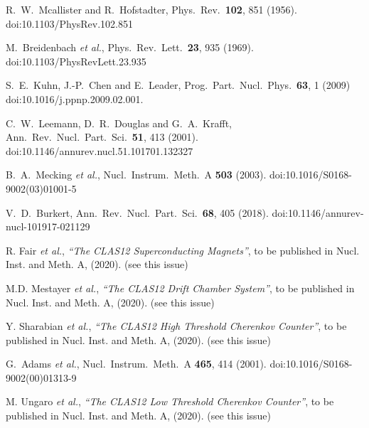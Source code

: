 \documentclass[final,3p,twocolumn]{elsarticle}
\begin{document}
\begin{thebibliography}{99}

  R.~W.~Mcallister and R.~Hofstadter,
  Phys.\ Rev.\  {\bf 102}, 851 (1956).
  doi:10.1103/PhysRev.102.851

  M.~Breidenbach {\it et al.},
  Phys.\ Rev.\ Lett.\  {\bf 23}, 935 (1969).
  doi:10.1103/PhysRevLett.23.935
  
  S.~E.~Kuhn, J.-P.~Chen and E.~Leader,
  Prog.\ Part.\ Nucl.\ Phys.\  {\bf 63}, 1 (2009)
  doi:10.1016/j.ppnp.2009.02.001.
 
  C.~W.~Leemann, D.~R.~Douglas and G.~A.~Krafft,
  Ann.\ Rev.\ Nucl.\ Part.\ Sci.\  {\bf 51}, 413 (2001).
  doi:10.1146/annurev.nucl.51.101701.132327

  B.~A.~Mecking {\it et al.},
  Nucl.\ Instrum.\ Meth.\ A {\bf 503} (2003).
  doi:10.1016/S0168-9002(03)01001-5

  V.~D.~Burkert,
  Ann.\ Rev.\ Nucl.\ Part.\ Sci.\  {\bf 68}, 405 (2018).
  doi:10.1146/annurev-nucl-101917-021129 
  
R. Fair {\it et al.}, {\it ``The CLAS12 Superconducting Magnets''}, to be published in Nucl. Inst.
and Meth. A, (2020). (see this issue)

M.D. Mestayer {\it et al.}, {\it ``The CLAS12 Drift Chamber System''}, to be published in Nucl. Inst.
and Meth. A, (2020). (see this issue)

Y. Sharabian {\it et al.}, {\it ``The CLAS12 High Threshold Cherenkov Counter''}, to be published in Nucl. Inst.
and Meth. A, (2020). (see this issue)

  G.~Adams {\it et al.},
  Nucl.\ Instrum.\ Meth.\ A {\bf 465}, 414 (2001).
  doi:10.1016/S0168-9002(00)01313-9

M. Ungaro {\it et al.}, {\it ``The CLAS12 Low Threshold Cherenkov Counter''}, to be published in Nucl. Inst.
and Meth. A, (2020). (see this issue)


\end{thebibliography}
\end{document}
